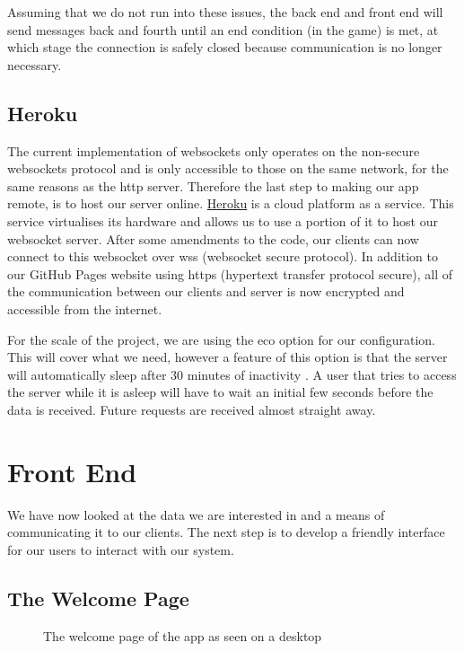 Assuming that we do not run into these issues, the back end and front end will send messages back and fourth until an end condition (in the game) is met, at which stage the connection is safely closed because communication is no longer necessary.

\subsection{Heroku}

The current implementation of websockets only operates on the non-secure websockets protocol and is only accessible to those on the same network, for the same reasons as the http server. Therefore the last step to making our app remote, is to host our server online. \href{https://www.heroku.com}{Heroku} is a cloud platform as a service. This service virtualises its hardware and allows us to use a portion of it to host our websocket server. After some amendments to the code, our clients can now connect to this websocket over wss (websocket secure protocol). In addition to our GitHub Pages website using https (hypertext transfer protocol secure), all of the communication between our clients and server is now encrypted and accessible from the internet.

For the scale of the project, we are using the eco option for our configuration. This will cover what we need, however a feature of this option is that the server will automatically sleep after 30 minutes of inactivity \cite{HerokuEco}. A user that tries to access the server while it is asleep will have to wait an initial few seconds before the data is received. Future requests are received almost straight away.

\section{Front End}

We have now looked at the data we are interested in and a means of communicating it to our clients. The next step is to develop a friendly interface for our users to interact with our system.

\subsection{The Welcome Page}

\begin{figure}
    \begin{center}
        \caption{The welcome page of the app as seen on a desktop}
        \label{fig:welcomePage}
    \end{center}
\end{figure}

